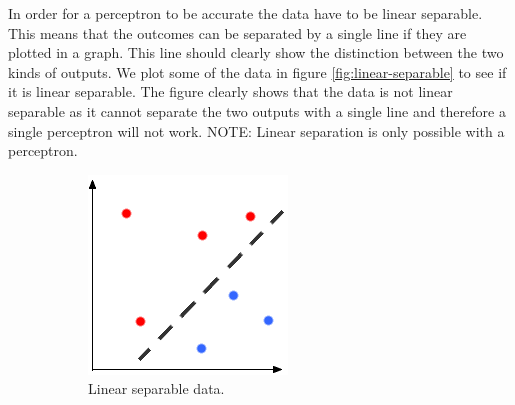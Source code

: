 In order for a perceptron to be accurate the data have to be linear separable. This means that the outcomes can be separated by a single line if they are plotted in a graph. This line should clearly show the distinction between the two kinds of outputs. We plot some of the data in figure \ref{fig:linear-separable} to see if it is linear separable.  The figure clearly shows that the data is not linear separable as it cannot separate the two outputs with a single line and therefore a single perceptron will not work. NOTE: Linear separation is only possible with a perceptron.
\begin{centering}
\begin{figure}
  \begin{subfigure}[b]{0.4\textwidth}
    \includegraphics[width=\textwidth]{images/nn/separable.png}
    \caption{Linear separable data.}
    \label{fig:1}
  \end{subfigure}
  \hspace{12mm}
  \begin{subfigure}[b]{0.4\textwidth}

\end{subfigure}
\end{figure}
\end{centering}
